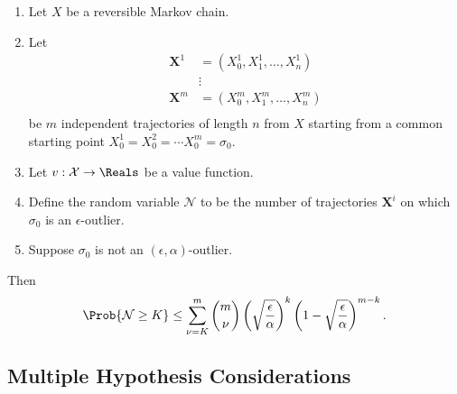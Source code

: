 \documentclass[12pt]{article}
\begin{document}
\begin{corollary}
    \begin{enumerate}
        \item
            Let \( X \) be a reversible Markov chain.
        \item
            Let
            \begin{align*}
                \mathbf{X}^1 &= (X_0^1, X_1^1, \dots, X_n^1 )\\
                &\vdots \\
                \mathbf{X}^m &= (X_0^m, X_1^m, \dots, X_n^m )\\
            \end{align*}
            be \( m \) independent trajectories of length \( n \) from \(
            X \) starting from a common starting point \( X_0^1 = X_0^2
            = \cdots X_0^m = \sigma_0 \).
        \item
            Let \( v :  \mathcal{X} \to \Reals \) be a value function.
        \item
            Define the random variable \( \mathcal{N} \) to be the
            number of trajectories \( \mathbf{X}^i \) on which \( \sigma_0
            \) is an \( \epsilon \)-outlier.
        \item
            Suppose \( \sigma_0 \) is not an \( (\epsilon, \alpha) \)-outlier.
    \end{enumerate}
    Then
    \[
        \Prob{\mathcal{N} \ge K} \le \sum\limits_ {\nu=K}^m \binom{m}{\nu}
        \left( \sqrt{\frac{\epsilon} {\alpha}} \right)^k \left( 1 -
        \sqrt{\frac {\epsilon}{\alpha}} \right)^ {m-k}.
    \]
\end{corollary}

\subsection*{Multiple Hypothesis Considerations}
\end{document}
